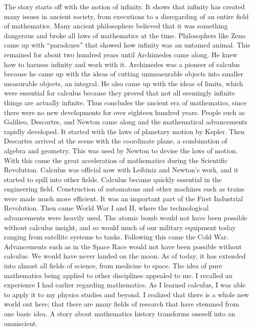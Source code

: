 The story starts off with the notion of infinity. It shows that infinity has created many issues in
ancient society, from executions to a disregarding of an entire field of mathematics. Many
ancient philosophers believed that it was something dangerous and broke all laws of
mathematics at the time. Philosophers like Zeno came up with “paradoxes” that showed how
infinity was an untamed animal. This remained for about two hundred years until Archimedes
came along. He knew how to harness infinity and work with it.
Archimedes was a pioneer of calculus because he came up with the ideas of cutting
unmeasurable objects into smaller measurable objects, an integral. He also came up with the
ideas of limits, which were essential for calculus because they proved that not all seemingly
infinite things are actually infinite. Thus concludes the ancient era of mathematics, since there
were no new developments for over eighteen hundred years.
People such as Galilieo, Descartes, and Newton came along and the mathematical
advancements rapidly developed. It started with the laws of planetary motion by Kepler. Then
Descartes arrived at the scene with the coordinate plane, a combination of algebra and
geometry. This was used by Newton to devise the laws of motion. With this came the great
acceleration of mathematics during the Scientific Revolution. Calculus was official now with
Leibiniz and Newton’s work, and it started to spill into other fields.
Calculus became quickly essential in the engineering field. Construction of automatons and
other machines such as trains were made much more efficient. It was an important part of the
First Industrial Revolution. Then came World War I and II, where the technological
advancements were heavily used. The atomic bomb would not have been possible without
calculus insight, and so would much of our military equipment today ranging from satellite
systems to tanks. Following this came the Cold War. Advancements such as in the Space Race
would not have been possible without calculus. We would have never landed on the moon. As
of today, it has extended into almost all fields of science, from medicine to space.
The idea of pure mathematics being applied to other disciplines appealed to me. I recalled an
experience I had earlier regarding mathematics. As I learned calculus, I was able to apply it to
my physics studies and beyond. I realized that there is a whole new world out here; that there
are many fields of research that have stemmed from one basic idea. A story about mathematics
history transforms oneself into an omniscient.
